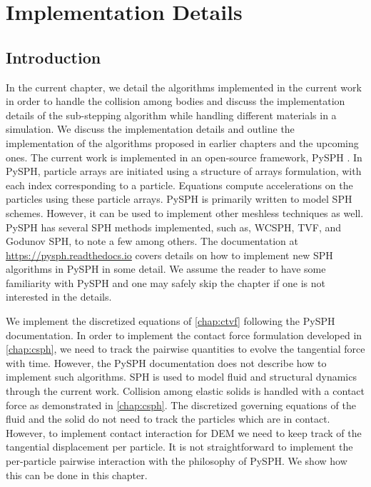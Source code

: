 \chapter{Implementation Details}
\label{chap:implementation_detail}
\section{Introduction}
\label{sec:intro}

In the current chapter, we detail the algorithms implemented in the current work
in order to handle the collision among bodies and discuss the implementation
details of the sub-stepping algorithm while handling different materials in a
simulation. We discuss the implementation details and outline the implementation
of the algorithms proposed in earlier chapters and the upcoming ones. The
current work is implemented in an open-source framework, PySPH
\parencite{pysph2020}. In PySPH, particle arrays are initiated using a structure of
arrays formulation, with each index corresponding to a particle. Equations
compute accelerations on the particles using these particle arrays. PySPH is
primarily written to model SPH schemes. However, it can be used to implement
other meshless techniques as well. PySPH has several SPH methods implemented,
such as, WCSPH, TVF, and Godunov SPH, to note a few among others. The
documentation at \url{https://pysph.readthedocs.io} covers details on how to
implement new SPH algorithms in PySPH in some detail. We assume the reader to
have some familiarity with PySPH and one may safely skip the chapter if one
is not interested in the details.


We implement the discretized equations of \cref{chap:ctvf} following the PySPH
documentation. In order to implement the contact force formulation developed in
\cref{chap:csph}, we need to track the pairwise quantities to evolve the
tangential force with time. However, the PySPH documentation does not describe
how to implement such algorithms. SPH is used to model fluid and structural
dynamics through the current work. Collision among elastic solids is handled
with a contact force as demonstrated in \cref{chap:csph}. The discretized
governing equations of the fluid and the solid do not need to track the
particles which are in contact. However, to implement contact interaction for
DEM we need to keep track of the tangential displacement per particle. It is not
straightforward to implement the per-particle pairwise interaction with the
philosophy of PySPH. We show how this can be done in this chapter.

